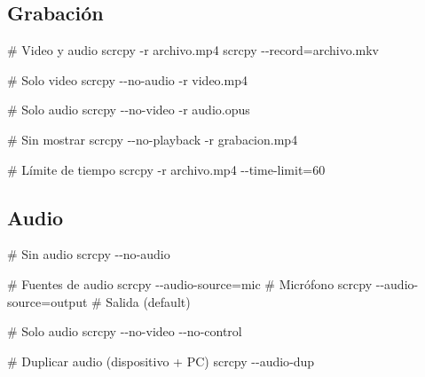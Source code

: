 \documentclass[
  doc,
  floatsintext,
  longtable,
  a4paper,
  nolmodern,
  notxfonts,
  notimes,
  12pt,
  colorlinks=true,linkcolor=blue,citecolor=blue,urlcolor=blue]{apa7}
\newenvironment{Shaded}{\begin{snugshade}}{\end{snugshade}}
\newcommand{\AttributeTok}[1]{\textcolor[rgb]{0.40,0.45,0.13}{#1}}
\newcommand{\CommentTok}[1]{\textcolor[rgb]{0.37,0.37,0.37}{#1}}
\newcommand{\ExtensionTok}[1]{\textcolor[rgb]{0.00,0.23,0.31}{#1}}
\newcommand{\NormalTok}[1]{\textcolor[rgb]{0.00,0.23,0.31}{#1}}
\newcommand{\OperatorTok}[1]{\textcolor[rgb]{0.37,0.37,0.37}{#1}}
\begin{document}
\subsection{Grabación}\label{grabaciuxf3n}

\begin{Shaded}
\begin{Highlighting}[]
\CommentTok{\# Video y audio}
\ExtensionTok{scrcpy} \AttributeTok{{-}r}\NormalTok{ archivo.mp4}
\ExtensionTok{scrcpy} \AttributeTok{{-}{-}record}\OperatorTok{=}\NormalTok{archivo.mkv}

\CommentTok{\# Solo video}
\ExtensionTok{scrcpy} \AttributeTok{{-}{-}no{-}audio} \AttributeTok{{-}r}\NormalTok{ video.mp4}

\CommentTok{\# Solo audio}
\ExtensionTok{scrcpy} \AttributeTok{{-}{-}no{-}video} \AttributeTok{{-}r}\NormalTok{ audio.opus}

\CommentTok{\# Sin mostrar}
\ExtensionTok{scrcpy} \AttributeTok{{-}{-}no{-}playback} \AttributeTok{{-}r}\NormalTok{ grabacion.mp4}

\CommentTok{\# Límite de tiempo}
\ExtensionTok{scrcpy} \AttributeTok{{-}r}\NormalTok{ archivo.mp4 }\AttributeTok{{-}{-}time{-}limit}\OperatorTok{=}\NormalTok{60}
\end{Highlighting}
\end{Shaded}

\subsection{Audio}\label{audio}

\begin{Shaded}
\begin{Highlighting}[]
\CommentTok{\# Sin audio}
\ExtensionTok{scrcpy} \AttributeTok{{-}{-}no{-}audio}

\CommentTok{\# Fuentes de audio}
\ExtensionTok{scrcpy} \AttributeTok{{-}{-}audio{-}source}\OperatorTok{=}\NormalTok{mic       }\CommentTok{\# Micrófono}
\ExtensionTok{scrcpy} \AttributeTok{{-}{-}audio{-}source}\OperatorTok{=}\NormalTok{output    }\CommentTok{\# Salida (default)}

\CommentTok{\# Solo audio}
\ExtensionTok{scrcpy} \AttributeTok{{-}{-}no{-}video} \AttributeTok{{-}{-}no{-}control}

\CommentTok{\# Duplicar audio (dispositivo + PC)}
\ExtensionTok{scrcpy} \AttributeTok{{-}{-}audio{-}dup}
\end{Highlighting}
\end{Shaded}
\end{document}
